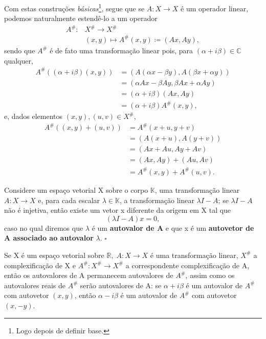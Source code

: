 \documentclass[../functional_analysis.tex]{subfiles}
\begin{document}
Com estas construções \textit{básicas}\footnote{Logo depois de definir base.}, segue que se \(A:X\rightarrow X\) é um operador linear, podemos naturalmente estendê-lo a um operador
\begin{align*}
	A^{\#}: & X^{\#}\rightarrow X^{\#}                          \\
	        & (x, y)\longmapsto A^{\#}(x, y)\coloneqq (Ax, Ay),
\end{align*}
sendo que \(A^{\#}\) é de fato uma transformação linear pois, para \((\alpha +i\beta) \in \mathbb{C}\) qualquer,
\begin{align*}
	A^{\#}((\alpha +i\beta )(x, y)) & =(A(\alpha x-\beta y), A(\beta x+\alpha y))    \\
	                                & = (\alpha Ax - \beta Ay, \beta Ax + \alpha Ay) \\
	                                & = (\alpha +i\beta )(Ax, Ay)                    \\
	                                & = (\alpha +i\beta )A^{\#}(x, y),
\end{align*}
e, dados elementos \((x, y), (u, v)\in X^{\#}\),
\begin{align*}
	A^{\#}((x, y) + (u, v)) & = A^{\#}(x+u, y+v)             \\
	                        & = (A(x+u), A(y+v))             \\
	                        & = (Ax + Au, Ay + Av)           \\
	                        & = (Ax, Ay) + (Au, Av)          \\
	                        & = A^{\#}(x, y) + A^{\#}(u, v).
\end{align*}

\begin{def*}
	Considere um espaço vetorial X sobre o corpo \(\mathbb{K}\), uma transformação linear \(A:X\rightarrow X\) e, para cada escalar \(\lambda \in \mathbb{K}\), a transformação linear \(\lambda I - A\); se \(\lambda I - A\) não é injetiva, então existe um vetor x diferente da origem em X tal que
	\[
		(\lambda I-A)x = 0,
	\]
	caso no qual diremos que \(\lambda \) é um \textbf{autovalor de A} e que x é um \textbf{autovetor de A associado ao autovalor }\(\lambda \). \(\square\)
\end{def*}

Se X é um espaço vetorial sobre \(\mathbb{R},\; A:X\rightarrow X\) é uma transformação linear, \(X^{\#}\) a complexificação de X e \(A^{\#}:X^{\#}\rightarrow X^{\#}\) a correspondente complexificação de A, então os autovalores de A permanecem autovalores de \(A^{\#}\), assim como os autovalores reais de \(A^{\#}\) serão autovalores de A: se \(\alpha +i\beta \) é um autovalor de \(A^{\#}\) com autovetor \((x, y)\), então \(\alpha -i\beta \) é um autovalor de \(A^{\#}\) com autovetor \((x, -y)\).
\end{document}
